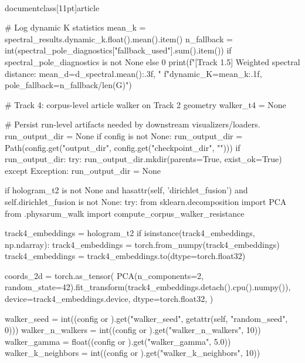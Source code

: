 \\documentclass[11pt]{article}
\begin{document}
\begin{CodeBlock}
                    # Log dynamic K statistics
                    mean_k = spectral_results.dynamic_k.float().mean().item()
                    n_fallback = int(spectral_pole_diagnostics["fallback_used"].sum().item()) if spectral_pole_diagnostics is not None else 0
                    print(f"[Track 1.5] Weighted spectral distance: mean_d={d_spectral.mean():.3f}, "
                          f"dynamic_K={mean_k:.1f}, pole_fallback={n_fallback}/{len(G)}")

                # Track 4: corpus-level article walker on Track 2 geometry
                walker_t4 = None

                # Persist run-level artifacts needed by downstream visualizers/loaders.
                run_output_dir = None
                if config is not None:
                    run_output_dir = Path(config.get("output_dir", config.get("checkpoint_dir", "")))
                if run_output_dir:
                    try:
                        run_output_dir.mkdir(parents=True, exist_ok=True)
                    except Exception:
                        run_output_dir = None

                if hologram_t2 is not None and hasattr(self, 'dirichlet_fusion') and self.dirichlet_fusion is not None:
                    try:
                        from sklearn.decomposition import PCA
                        from .physarum_walk import compute_corpus_walker_resistance

                        track4_embeddings = hologram_t2
                        if isinstance(track4_embeddings, np.ndarray):
                            track4_embeddings = torch.from_numpy(track4_embeddings)
                        track4_embeddings = track4_embeddings.to(dtype=torch.float32)

                        coords_2d = torch.as_tensor(
                            PCA(n_components=2, random_state=42).fit_transform(track4_embeddings.detach().cpu().numpy()),
                            device=track4_embeddings.device,
                            dtype=torch.float32,
                        )

                        walker_seed = int((config or {}).get("walker_seed", getattr(self, "random_seed", 0)))
                        walker_n_walkers = int((config or {}).get("walker_n_walkers", 10))
                        walker_gamma = float((config or {}).get("walker_gamma", 5.0))
                        walker_k_neighbors = int((config or {}).get("walker_k_neighbors", 10))


\end{CodeBlock}
\end{document}
